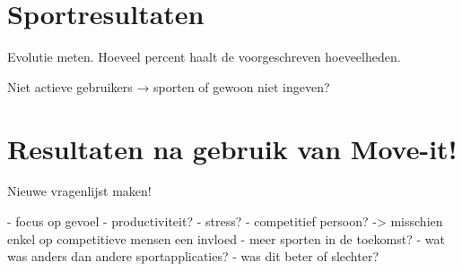 \section{Sportresultaten}

Evolutie meten. Hoeveel percent haalt de voorgeschreven hoeveelheden.

Niet actieve gebruikers → sporten of gewoon niet ingeven?

\section{Resultaten na gebruik van Move-it!}

Nieuwe vragenlijst maken!

- focus op gevoel
- productiviteit?
- stress?
- competitief persoon? -> misschien enkel op competitieve mensen een invloed
- meer sporten in de toekomst?
- wat was anders dan andere sportapplicaties?
    - was dit beter of slechter?
